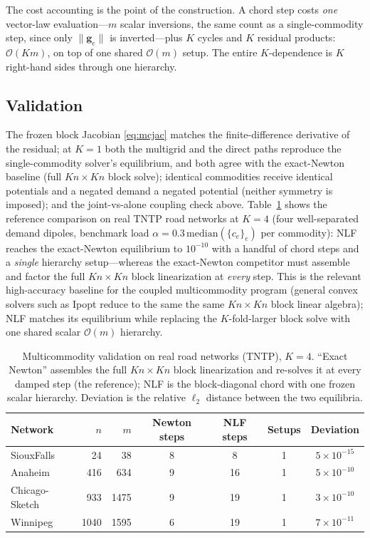 \documentclass{siamart220329}
\newcommand{\Om}{\mathcal{O}(m)}
\begin{document}
The cost accounting is the point of the construction. A chord step costs \emph{one} vector-law
evaluation---$m$ scalar inversions, the same count as a single-commodity step, since only
$\|\mathbf g_e\|$ is inverted---plus $K$ cycles and $K$ residual products: $\mathcal{O}(Km)$, on top
of one shared $\Om$ setup. The entire $K$-dependence is $K$ right-hand sides through one hierarchy.

\subsection{Validation}\label{sec:mcvalid}
The frozen block Jacobian \eqref{eq:mcjac} matches the
finite-difference derivative of the residual; at $K=1$ both the multigrid and the direct paths
reproduce the single-commodity solver's equilibrium, and both agree with the exact-Newton baseline (full $Kn\times Kn$ block solve); identical commodities receive identical potentials and a negated
demand a negated potential (neither symmetry is imposed); and the joint-vs-alone coupling check
above. Table~\ref{tab:mcvalid} shows the reference comparison on real TNTP road networks at $K=4$
(four well-separated demand dipoles, benchmark load $\alpha=0.3\,\mathrm{median}(\{c_e\}_e)$ per commodity):
NLF reaches the exact-Newton equilibrium to $10^{-10}$ with a handful of chord steps and a
\emph{single} hierarchy setup---whereas the exact-Newton competitor must assemble and factor the full
$Kn\times Kn$ block linearization at \emph{every} step. This is the relevant high-accuracy baseline
for the coupled multicommodity program (general convex solvers such as Ipopt reduce to the same
the same $Kn\times Kn$ block linear algebra); NLF matches its equilibrium while replacing the $K$-fold-larger
block solve with one shared scalar $\Om$ hierarchy.

\begin{table}[t]\centering\small
\caption{Multicommodity validation on real road networks (TNTP), $K=4$. ``Exact Newton'' assembles
the full $Kn\times Kn$ block linearization and re-solves it at every damped step (the reference);
NLF is the block-diagonal chord with one frozen scalar hierarchy. Deviation is the relative
$\ell_2$ distance between the two equilibria.}\label{tab:mcvalid}
\begin{tabular}{lrrcccc}
\toprule
Network & $n$ & $m$ & Newton steps & NLF steps & Setups & Deviation\\
\midrule
SiouxFalls     & 24   & 38   & 8 & 8  & 1 & $5\times10^{-15}$\\
Anaheim        & 416  & 634  & 9 & 16 & 1 & $5\times10^{-10}$\\
Chicago-Sketch & 933  & 1475 & 9 & 19 & 1 & $3\times10^{-10}$\\
Winnipeg       & 1040 & 1595 & 6 & 19 & 1 & $7\times10^{-11}$\\
\bottomrule
\end{tabular}
\end{table}
\end{document}
